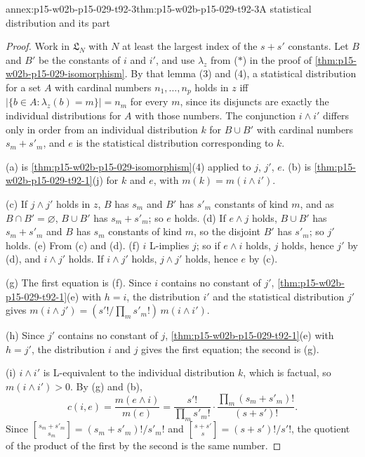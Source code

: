 \begin{annexitem}{annex:p15-w02b-p15-029-t92-3}{thm:p15-w02b-p15-029-t92-3}{A statistical distribution and its part}
\begin{proof}
Work in \(\mathfrak L_N\) with \(N\) at least the largest index of the
\(s+s'\) constants. Let \(B\) and \(B'\) be the constants of \(i\) and
\(i'\), and use \(\lambda_z\) from (\(*\)) in the proof of
\cref{thm:p15-w02b-p15-029-isomorphism}. By that lemma (3) and (4), a
statistical distribution for a set \(A\) with cardinal numbers
\(n_1,\ldots,n_p\) holds in \(z\) iff
\(\lvert\{b\in A:\lambda_z(b)=m\}\rvert=n_m\) for every \(m\), since its
disjuncts are exactly the individual distributions for \(A\) with those
numbers. The conjunction \(i\land i'\) differs only in order from an
individual distribution \(k\) for \(B\cup B'\) with cardinal numbers
\(s_m+s'_m\), and \(e\) is the statistical distribution corresponding
to \(k\).

(a) is \cref{thm:p15-w02b-p15-029-isomorphism}(4) applied to \(j\),
\(j'\), \(e\). (b) is \cref{thm:p15-w02b-p15-029-t92-1}(j) for \(k\)
and \(e\), with \(m(k)=m(i\land i')\).

(c) If \(j\land j'\) holds in \(z\), \(B\) has \(s_m\) and \(B'\) has
\(s'_m\) constants of kind \(m\), and as \(B\cap B'=\varnothing\),
\(B\cup B'\) has \(s_m+s'_m\); so \(e\) holds. (d) If \(e\land j\)
holds, \(B\cup B'\) has \(s_m+s'_m\) and \(B\) has \(s_m\) constants of
kind \(m\), so the disjoint \(B'\) has \(s'_m\); so \(j'\) holds. (e)
From (c) and (d). (f) \(i\) L-implies \(j\); so if \(e\land i\) holds,
\(j\) holds, hence \(j'\) by (d), and \(i\land j'\) holds. If
\(i\land j'\) holds, \(j\land j'\) holds, hence \(e\) by (c).

(g) The first equation is (f). Since \(i\) contains no constant of
\(j'\), \cref{thm:p15-w02b-p15-029-t92-1}(e) with \(h=i\), the
distribution \(i'\) and the statistical distribution \(j'\) gives
\(m(i\land j')=(s'!/\prod_ms'_m!)\,m(i\land i')\).

(h) Since \(j'\) contains no constant of \(j\),
\cref{thm:p15-w02b-p15-029-t92-1}(e) with \(h=j'\), the distribution
\(i\) and \(j\) gives the first equation; the second is (g).

(i) \(i\land i'\) is L-equivalent to the individual distribution \(k\),
which is factual, so \(m(i\land i')>0\). By (g) and (b),
\[
 c(i,e)=\frac{m(e\land i)}{m(e)}
 =\frac{s'!}{\prod_ms'_m!}\cdot\frac{\prod_m(s_m+s'_m)!}{(s+s')!}.
\]
Since \(\genfrac{[}{]}{0pt}{}{s_m+s'_m}{s_m}=(s_m+s'_m)!/s'_m!\) and
\(\genfrac{[}{]}{0pt}{}{s+s'}{s}=(s+s')!/s'!\), the quotient of the
product of the first by the second is the same number.


\end{proof}
\end{annexitem}
